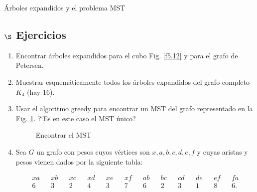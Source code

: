 \begin{section}{Árboles expandidos y el problema MST}
\subsection*{$\S$ Ejercicios}
\begin{enumerate}
    \item Encontrar árboles expandidos para el cubo Fig. \ref{f5.12} y para el grafo de Petersen.

    \item Muestrar esquemáticamente todos los árboles expandidos del grafo completo $K_4$ (hay $16$).    

    \item Usar el algoritmo greedy para encontrar un MST del grafo representado en la Fig. \ref{f6.5}. ?`Es en este caso el MST único?
    \begin{figure}[ht]
    \begin{center}
    \end{center}
    \caption{Encontrar el MST} \label{f6.5}
\end{figure}

\item Sea $G$ un grafo con pesos cuyos vértices son $x,a,b,c,d,e,f$ y cuyas aristas y pesos vienen dados por la siguiente tabla:

\begin{align*}
xa &&xb &&xc &&xd &&xe &&xf &&ab &&bc &&cd &&de &&ef &&fa \\
6  &&3  &&2  &&4  &&3  &&7  &&6  &&2  &&3  &&1  &&8  &&6.
\end{align*}


\end{enumerate}
\end{section}
